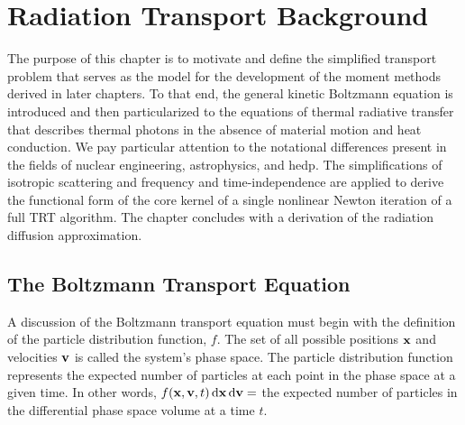 \documentclass[../doc.tex]{subfiles}
\begin{document}
\chapter{Radiation Transport Background} \label{chap:transport}
The purpose of this chapter is to motivate and define the simplified transport problem that serves as the model for the development of the moment methods derived in later chapters. To that end, the general kinetic Boltzmann equation is introduced and then particularized to the equations of thermal radiative transfer that describes thermal photons in the absence of material motion and heat conduction. We pay particular attention to the notational differences present in the fields of nuclear engineering, astrophysics, and \gls{hedp}. The simplifications of isotropic scattering and frequency and time-independence are applied to derive the functional form of the core kernel of a single nonlinear Newton iteration of a full TRT algorithm. The chapter concludes with a derivation of the radiation diffusion approximation. 

\section{The Boltzmann Transport Equation}
A discussion of the Boltzmann transport equation must begin with the definition of the particle distribution function, $f$. 
The set of all possible positions $\boldsymbol{\mathrm{x}}$ and velocities $\boldsymbol{\mathrm{v}}$ is called the system's phase space. The particle distribution function represents the expected number of particles at each point in the phase space at a given time. In other words, $f(\boldsymbol{\mathrm{x}},\boldsymbol{\mathrm{v}},t) \mathop{}\!\mathrm{d} \boldsymbol{\mathrm{x}} \mathop{}\!\mathrm{d} \boldsymbol{\mathrm{v}} = $ the expected number of particles in the differential phase space volume at a time $t$. 
\end{document}
